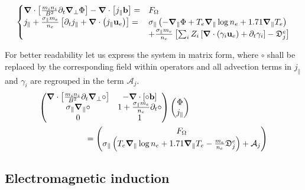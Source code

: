 \begin{equation}
	\label{eq:S3X_vorticityEquation_ElectronInertia}
	\begin{cases}
		\grad\cdot\left[\frac{m_i n_i}{ B^2}\partial_t\grad_\perp\Phi\right] - \grad\cdot\left[j_\parallel\mathbf{b}\right]=& F_\Omega \\
		j_\parallel + \frac{\sigma_\parallel m_e}{n_e}\left[\partial_t j_\parallel + \grad\cdot\left(j_\parallel\mathbf{u}_e\right)\right] =& \sigma_\parallel \left(-\grad_\parallel\Phi + T_e\grad_\parallel\log n_e + 1.71\grad_\parallel T_e \right) \\ 
		& + \frac{\sigma_\parallel m_e}{n_e}\left[\sum_iZ_i\left[\grad\cdot\left(\gamma_i\mathbf{u}_e \right) + \partial_t \gamma_i\right] - \mathfrak{D}_j^e\right]
	\end{cases}
\end{equation}



For better readability let us express the system in matrix form, where $\circ$ shall be replaced by the corresponding field within operators and all advection terms in $j_\parallel$ and $\gamma_i$ are regrouped in the term $\mathcal{A}_j$. 
\begin{align}
	\makebox[0.8\textwidth][l]{$\displaystyle
		\begin{pmatrix}
			\grad\cdot\left[\frac{m_i n_i}{ B^2}\partial_t\grad_\perp\circ\right] & 
			- \grad\cdot\left[\circ\mathbf{b}\right] \\
			\sigma_\parallel\grad_\parallel\circ &
			1 + \frac{\sigma_\parallel m_e}{n_e}\partial_t \circ \\
			0 & 1 
		\end{pmatrix}
		\begin{pmatrix}
			\Phi \\ j_\parallel
		\end{pmatrix}
		$} \nonumber \\	
	\makebox[0.8\textwidth][r]{$\displaystyle
		=\begin{pmatrix}
			F_\Omega \\
			\sigma_\parallel\left(T_e\grad_\parallel\log n_e + 1.71\grad_\parallel T_e - \frac{m_e}{n_e}\mathfrak{D}_j^e \right) + \mathcal{A}_j		
		\end{pmatrix}
		$} \label{eq:S3X_vorticityEquation_ElectronInertia_matrix}
\end{align}






\subsection{Electromagnetic induction}


